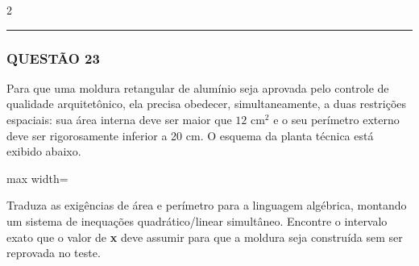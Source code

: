 \documentclass[twoside, 10pt, a4paper]{article}
\begin{document}
\begin{multicols*}{2}
\vspace{0cm} \noindent\textcolor{CorLinha}{\rule{\linewidth}{0.5pt}} \vspace{-0.2cm}
\subsubsection*{QUESTÃO 23}
Para que uma moldura retangular de alumínio seja aprovada pelo controle de qualidade arquitetônico, ela precisa obedecer, simultaneamente, a duas restrições espaciais: sua área interna deve ser maior que $ 12 \text{ cm}^2 $ e o seu perímetro externo deve ser rigorosamente inferior a 20 cm. O esquema da planta técnica está exibido abaixo.

\begin{center}
\begin{adjustbox}{max width=\linewidth}
\end{adjustbox}
\end{center}

Traduza as exigências de área e perímetro para a linguagem algébrica, montando um sistema de inequações quadrático/linear simultâneo. Encontre o intervalo exato que o valor de \textbf{x} deve assumir para que a moldura seja construída sem ser reprovada no teste.


\end{multicols*}
\end{document}
